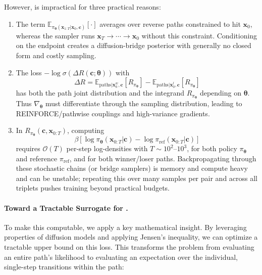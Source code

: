 However,  is impractical for three practical reasons:
\begin{enumerate}[leftmargin=*]
\item {}
The term $\mathbb E_{\pi_{\bm\theta}(\mathbf x_{1:T}|\mathbf x_0,\mathbf c)}[\cdot]$ averages over reverse paths constrained to hit $\mathbf x_0$, whereas the sampler runs $\mathbf x_T \to \cdots \to \mathbf x_0$ without this constraint. Conditioning on the endpoint creates a diffusion-bridge posterior with generally no closed form and costly sampling.

\item {}
The loss $-\log\sigma(\Delta R(\mathbf c;\bm\theta))$ with
\[
\Delta R=\mathbb E_{\text{paths}|\mathbf x_0^w,\mathbf c}[R_{\pi_{\bm\theta}}]
-\mathbb E_{\text{paths}|\mathbf x_0^l,\mathbf c}[R_{\pi_{\bm\theta}}]
\]
has both the path joint distribution and the integrand $R_{\pi_{\bm\theta}}$ depending on $\bm\theta$. Thus $\nabla_{\bm\theta}$ must differentiate through the sampling distribution, leading to REINFORCE/pathwise couplings and high-variance gradients.

\item {}
In $R_{\pi_{\bm\theta}}(\mathbf c,\mathbf x_{0:T})$, computing
\[
\beta \left[\log \pi_{\bm\theta}(\mathbf x_{0:T}|\mathbf c)
-\log \pi_{\mathrm{ref}}(\mathbf x_{0:T}|\mathbf c)\right]
\]
requires $\mathcal O(T)$ per-step log-densities with $T \sim 10^2$–$10^3$, for both policy $\pi_{\bm\theta}$ and reference $\pi_{\mathrm{ref}}$, and for both winner/loser paths. Backpropagating through these stochastic chains (or bridge samplers) is memory and compute heavy and can be unstable; repeating this over many samples per pair and across all triplets pushes training beyond practical budgets.
\end{enumerate}

\paragraph{Toward a Tractable Surrogate for .}
To make this computable, we apply a key mathematical insight. By leveraging properties of diffusion models and applying Jensen's inequality, we can optimize a tractable upper bound on this loss. This transforms the problem from evaluating an entire path's likelihood to evaluating an expectation over the individual, single-step transitions within the path:

